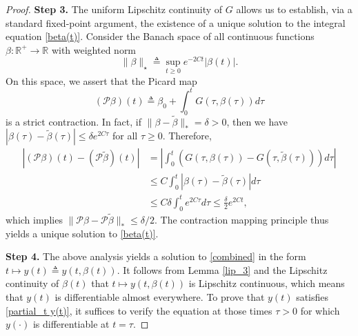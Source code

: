 \documentclass[10pt]{article}
\numberwithin{equation}{section}
\begin{document}
\begin{proof}
		\textbf{Step 3.} The uniform Lipschitz continuity of $G$ allows us to establish, via a standard fixed-point argument, the existence of a unique solution to the integral equation \eqref{beta(t)}. Consider the Banach space of all continuous functions $\beta:\mathbb{R}^+\to\mathbb{R}$ with weighted norm
		$$\|\beta\|_\star\triangleq\sup_{t\geq0}e^{-2Ct}|\beta(t)|.$$
		On this space, we assert that the Picard map
		$$(\mathcal{P}\beta)(t)\triangleq \beta_0+\int_0^tG(\tau,\beta(\tau))d\tau$$
		is a strict contraction. In fact, if $\|\beta-\tilde{\beta}\|_*=\delta>0$, then we have $|\beta(\tau)-\tilde{\beta}(\tau)|\leq\delta e^{2C\tau}$ for all $\tau\geq0$. Therefore, 
		\begin{align*}
			\left|(\mathcal{P}\beta)(t)-(\mathcal{P}\tilde{\beta})(t)\right| & =\left|\int_{0}^{t}\left(G(\tau,\beta(\tau))-G(\tau,\tilde{\beta}(\tau))\right)d\tau\right| \\
			& \leq C\int_{0}^{t}|\beta(\tau)-\tilde{\beta}(\tau)|d\tau \\
			& \leq C\delta\int_{0}^{t} e^{2C\tau}d\tau\leq\frac{\delta}{2}e^{2Ct},
		\end{align*}
		which implies $\|\mathcal{P}\beta-\mathcal{P}\tilde{\beta}\|_{*}\leq\delta/2$. The contraction mapping principle thus yields a unique solution to \eqref{beta(t)}.
		
		\textbf{Step 4.} The above analysis yields a solution to \eqref{combined} in the form $t \mapsto y(t) \triangleq y(t, \beta(t))$. It follows from Lemma \ref{lip_3} and the Lipschitz continuity of $\beta(t)$ that $t \mapsto y(t, \beta(t))$ is Lipschitz continuous, which means that $y(t)$ is differentiable almost everywhere. To prove that $y(t)$ satisfies \eqref{partial_t y(t)}, it suffices to verify the equation at those times $\tau > 0$ for which $y(\cdot)$ is differentiable at $t=\tau$.
		

\end{proof}
\end{document}
